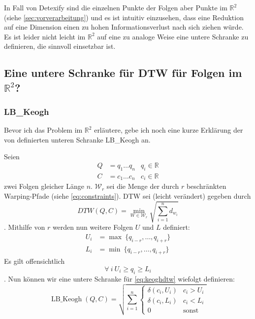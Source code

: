 
In Fall von Detexify sind die einzelnen Punkte der Folgen aber Punkte im \( \mathbb{R}^2 \) (siehe \ref{sec:vorverarbeitung}) und es ist intuitiv einzusehen, dass eine Reduktion auf eine Dimension einen zu hohen Informationsverlust nach sich ziehen würde. Es ist leider nicht leicht im  \( \mathbb{R}^2 \) auf eine zu \cite{Keogh:2005p7751} analoge Weise eine untere Schranke zu definieren, die sinnvoll einsetzbar ist.

\subsection{Eine untere Schranke für DTW für Folgen im \( \mathbb{R}^2 \)?}

\subsubsection{LB\_Keogh}
\label{ssub:lb_keogh}

Bevor ich das Problem im \( \mathbb{R}^2 \) erläutere, gebe ich noch eine kurze Erklärung der von \citet{Keogh:2005p7751} definierten unteren Schranke LB\_Keogh an.

Seien
\begin{align}
  Q &= q_1 \dots q_n  & q_i \in \mathbb{R} \\
  C &= c_1 \dots c_n  & c_i \in \mathbb{R}
\end{align}
zwei Folgen gleicher Länge $n$. \( \mathcal{W}_r \) sei die Menge der durch \(r\) beschränkten Warping-Pfade (siehe \ref{eq:constraints}). DTW sei (leicht verändert) gegeben durch
\begin{equation}
  \label{eq:keoghdtw}
  DTW(Q,C) = \min_{W \in \mathcal{W}_r}{\sqrt{\sum_{i=1}^n d_{w_i}}}
\end{equation}.
Mithilfe von \(r\) werden nun weitere Folgen $U$ und $L$ definiert:
\begin{align}
  U_i &= \max ~\{ q_{i-r}, \dots, q_{i+r} \}\\
  L_i &= \min ~\{ q_{i-r}, \dots, q_{i+r} \}
\end{align}
Es gilt offensichtlich
\begin{equation}
  \forall ~ i ~ U_i \geq q_i \geq L_i
\end{equation}.
Nun können wir eine untere Schranke für \ref{eq:keoghdtw} wiefolgt definieren:
\begin{equation}
  \label{eq:lbkeogh}
  \operatorname{LB\_Keogh}(Q,C) = \sqrt{\sum_{i=1}^n
  \begin{cases}
    \delta(c_i, U_i) & c_i > U_i \\
    \delta(c_i, L_i) & c_i < L_i \\
    0 & \text{sonst}
  \end{cases}
  }
\end{equation}

